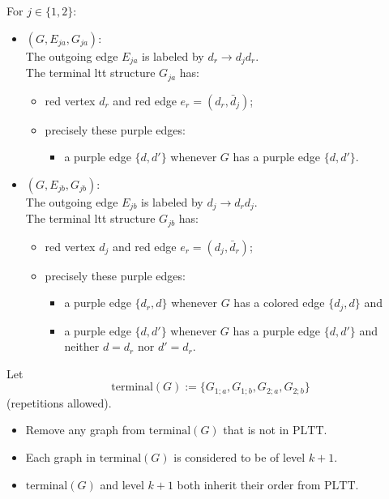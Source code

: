 \documentclass[11pt]{article}
\theoremstyle{definition}
\begin{document}
For $j\in\{1,2\}$:
\begin{itemize}
  \item[] $(G, E_{ja}, G_{ja})$:\\ 
  The outgoing edge $E_{ja}$ is labeled by $d_r \to d_j d_r$.\\
  The terminal ltt structure $G_{ja}$ has:
        \begin{itemize}
          \item red vertex $d_r$ and red edge $e_r=(d_r,\bar{d}_j)$;
          \item precisely these purple edges:
                \begin{itemize}
                  \item a purple edge $\{d,d'\}$ whenever $G$ has a purple edge
                        $\{d,d'\}$.
                \end{itemize}
        \end{itemize}
  \item[] $(G, E_{jb}, G_{jb})$:\\
  The outgoing edge $E_{jb}$ is labeled by $d_j \to d_r d_j$.\\
  The terminal ltt structure $G_{jb}$ has:
        \begin{itemize}
          \item red vertex $d_j$ and red edge $e_r=(d_j,\bar{d}_r)$;
          \item precisely these purple edges:
                \begin{itemize}
                  \item a purple edge $\{d_r,d\}$ whenever $G$ has a colored edge
                        $\{d_j,d\}$ and
                  \item a purple edge $\{d,d'\}$ whenever $G$ has a purple edge
                        $\{d,d'\}$ and neither $d=d_r$ nor $d'=d_r$.
                \end{itemize}
        \end{itemize}
\end{itemize}

Let
\[
\mathrm{terminal}(G):=\{G_{1;a},G_{1;b},G_{2;a},G_{2;b}\}
\]
(repetitions allowed).
\begin{itemize}
  \item Remove any graph from $\mathrm{terminal}(G)$ that is not in $\mathrm{PLTT}$.
  \item Each graph in $\mathrm{terminal}(G)$ is considered to be of level $k+1$.
  \item $\mathrm{terminal}(G)$ and level $k+1$ both inherit their order from
        $\mathrm{PLTT}$.
\end{itemize}
\end{document}
